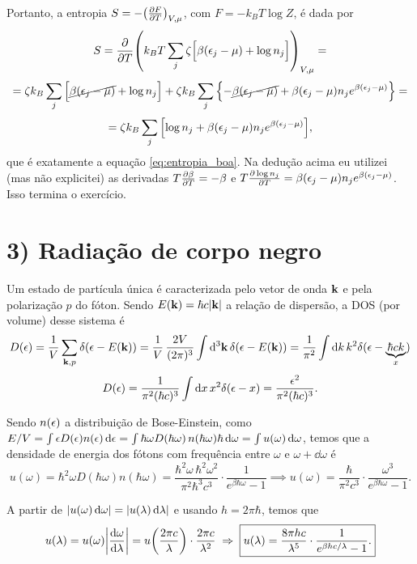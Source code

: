 \documentclass[a4paper,10pt]{article}
\begin{document}
Portanto, a entropia $S = -\qty(\pdv{F}{T})_{V,\mu}$, com $F = -k_B T \log Z$, é dada por
$$
S = \pdv{T} \qty(k_B T \sum_{j} \zeta \Big[\beta(\epsilon_j-\mu) + \log n_j\Big])_{V,\mu} =
$$
$$
= \zeta k_B \sum_{j} \Big[\cancel{\beta(\epsilon_j-\mu)} + \log n_j\Big] +
\zeta k_B \sum_{j} \qty{-\cancel{\beta (\epsilon_j - \mu)} + \beta(\epsilon_j-\mu) n_j e^{\beta(\epsilon_j-\mu)}} =
$$
$$
= \zeta k_B \sum_{j} \qty[\log n_j + \beta (\epsilon_j - \mu) n_j e^{\beta(\epsilon_j-\mu)}],
$$
que é exatamente a equação \ref{eq:entropia_boa}. Na dedução acima eu utilizei (mas não explicitei) as derivadas $T \pdv{\beta}{T} = -\beta$ e $T \pdv{\log n_j}{T} = \beta (\epsilon_j-\mu) n_j e^{\beta(\epsilon_j-\mu)}$. Isso termina o exercício.

\pagebreak

\section*{3) Radiação de corpo negro}

Um estado de partícula única é caracterizada pelo vetor de onda $\vb{k}$ e pela polarização $p$ do fóton. Sendo $E(\vb{k}) = \hbar c \abs{\vb{k}}$ a relação de dispersão, a DOS (por volume) desse sistema é
$$
D(\epsilon) = \frac{1}{V} \sum_{\vb{k},p} \delta(\epsilon-E(\vb{k})) = \frac{1}{V} \, \frac{2V}{(2\pi)^3} \int \dd[3]{\vb{k}} \delta(\epsilon-E(\vb{k})) =
\frac{1}{\pi^2} \int \dd{k} k^2 \delta(\epsilon-\underbrace{\hbar c k}_{x})
$$
$$
D(\epsilon) = \frac{1}{\pi^2 (\hbar c)^3} \int \dd{x} x^2 \delta(\epsilon-x)
= \frac{\epsilon^2}{\pi^2 (\hbar c)^3}.
$$

Sendo $n(\epsilon)$ a distribuição de Bose-Einstein, como $E/V = \int \epsilon D(\epsilon) n(\epsilon) \dd{\epsilon} = \int \hbar \omega D(\hbar\omega)\, n(\hbar\omega) \hbar \dd{\omega} = \int u(\omega) \dd{\omega}$, temos que a densidade de energia dos fótons com frequência entre $\omega$ e $\omega + \dd{\omega}$ é
$$
u(\omega) = \hbar^2 \omega D(\hbar\omega) n(\hbar\omega) = \frac{\hbar^2 \omega \, \hbar^2 \omega^2}{\pi^2 \hbar^3 c^3} \cdot
\frac{1}{e^{\beta\hbar\omega} - 1} \implies
\boxed{ u(\omega) =
\frac{\hbar}{\pi^2 c^3} \cdot \frac{\omega^3}{e^{\beta\hbar\omega} - 1}. }
$$

A partir de $\abs{u(\omega) \dd{\omega}} = \abs{u(\lambda) \dd{\lambda}}$ e usando $h = 2\pi \hbar$, temos que
$$
u(\lambda) = u(\omega) \abs{\dv{\omega}{\lambda}} = u\qty(\frac{2\pi c}{\lambda}) \cdot \frac{2\pi c}{\lambda^2} \; \Rightarrow \;
\boxed{ u(\lambda) =
\frac{8 \pi h c}{\lambda^5} \cdot \frac{1}{e^{\beta hc / \lambda} - 1}. }
$$

\n
\end{document}
